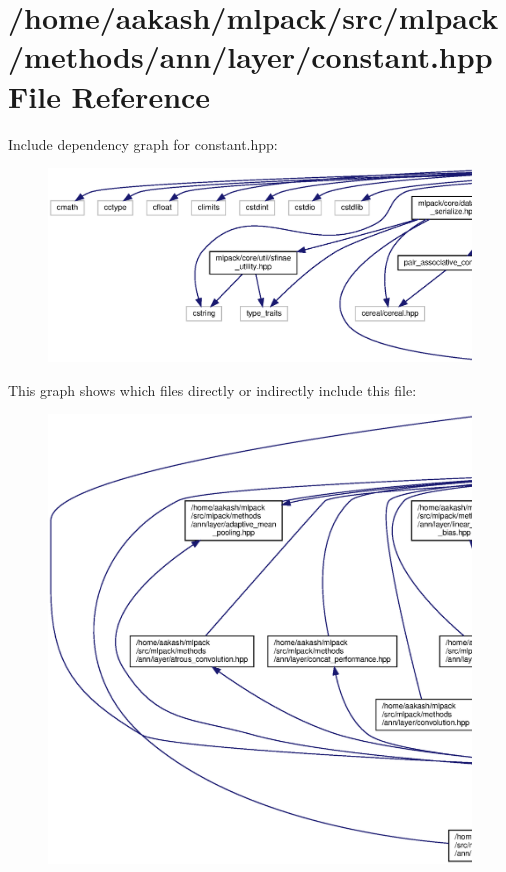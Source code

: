 \section{/home/aakash/mlpack/src/mlpack/methods/ann/layer/constant.hpp File Reference}
\label{constant_8hpp}
Include dependency graph for constant.\+hpp\+:
\nopagebreak
\begin{figure}[H]
\begin{center}
\leavevmode
\includegraphics[width=350pt]{constant_8hpp__incl}
\end{center}
\end{figure}
This graph shows which files directly or indirectly include this file\+:
\nopagebreak
\begin{figure}[H]
\begin{center}
\leavevmode
\includegraphics[width=350pt]{constant_8hpp__dep__incl}
\end{center}
\end{figure}
